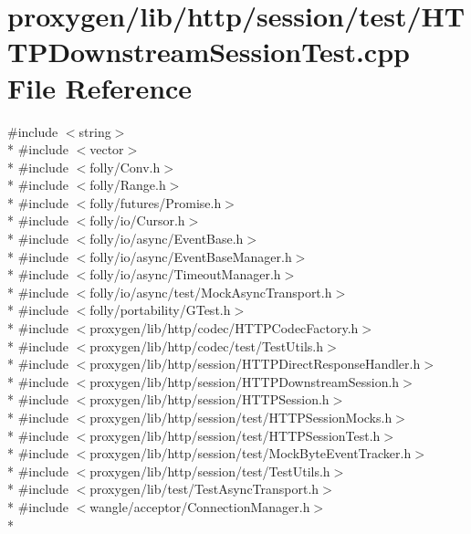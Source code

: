 \section{proxygen/lib/http/session/test/\+H\+T\+T\+P\+Downstream\+Session\+Test.cpp File Reference}
\label{HTTPDownstreamSessionTest_8cpp}
{\ttfamily \#include $<$string$>$}\\*
{\ttfamily \#include $<$vector$>$}\\*
{\ttfamily \#include $<$folly/\+Conv.\+h$>$}\\*
{\ttfamily \#include $<$folly/\+Range.\+h$>$}\\*
{\ttfamily \#include $<$folly/futures/\+Promise.\+h$>$}\\*
{\ttfamily \#include $<$folly/io/\+Cursor.\+h$>$}\\*
{\ttfamily \#include $<$folly/io/async/\+Event\+Base.\+h$>$}\\*
{\ttfamily \#include $<$folly/io/async/\+Event\+Base\+Manager.\+h$>$}\\*
{\ttfamily \#include $<$folly/io/async/\+Timeout\+Manager.\+h$>$}\\*
{\ttfamily \#include $<$folly/io/async/test/\+Mock\+Async\+Transport.\+h$>$}\\*
{\ttfamily \#include $<$folly/portability/\+G\+Test.\+h$>$}\\*
{\ttfamily \#include $<$proxygen/lib/http/codec/\+H\+T\+T\+P\+Codec\+Factory.\+h$>$}\\*
{\ttfamily \#include $<$proxygen/lib/http/codec/test/\+Test\+Utils.\+h$>$}\\*
{\ttfamily \#include $<$proxygen/lib/http/session/\+H\+T\+T\+P\+Direct\+Response\+Handler.\+h$>$}\\*
{\ttfamily \#include $<$proxygen/lib/http/session/\+H\+T\+T\+P\+Downstream\+Session.\+h$>$}\\*
{\ttfamily \#include $<$proxygen/lib/http/session/\+H\+T\+T\+P\+Session.\+h$>$}\\*
{\ttfamily \#include $<$proxygen/lib/http/session/test/\+H\+T\+T\+P\+Session\+Mocks.\+h$>$}\\*
{\ttfamily \#include $<$proxygen/lib/http/session/test/\+H\+T\+T\+P\+Session\+Test.\+h$>$}\\*
{\ttfamily \#include $<$proxygen/lib/http/session/test/\+Mock\+Byte\+Event\+Tracker.\+h$>$}\\*
{\ttfamily \#include $<$proxygen/lib/http/session/test/\+Test\+Utils.\+h$>$}\\*
{\ttfamily \#include $<$proxygen/lib/test/\+Test\+Async\+Transport.\+h$>$}\\*
{\ttfamily \#include $<$wangle/acceptor/\+Connection\+Manager.\+h$>$}\\*
